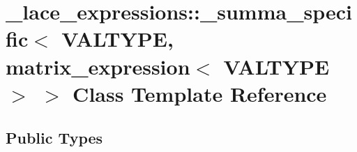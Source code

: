 \hypertarget{class__lace__expressions_1_1__summa__specific_3_01VALTYPE_00_01matrix__expression_3_01VALTYPE_01_4_01_4}{\section{\-\_\-lace\-\_\-expressions\-:\-:\-\_\-summa\-\_\-specific$<$ V\-A\-L\-T\-Y\-P\-E, matrix\-\_\-expression$<$ V\-A\-L\-T\-Y\-P\-E $>$ $>$ Class Template Reference}
\label{class__lace__expressions_1_1__summa__specific_3_01VALTYPE_00_01matrix__expression_3_01VALTYPE_01_4_01_4}
}
\subsection*{Public Types}
